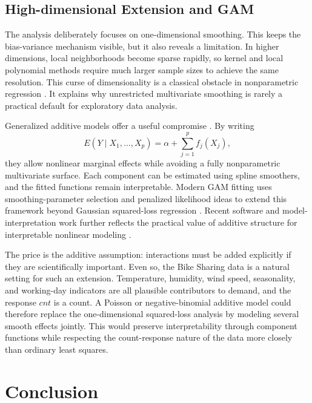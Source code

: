\documentclass[12pt,a4paper]{article}
\begin{document}
\subsection{High-dimensional Extension and GAM}

The analysis deliberately focuses on one-dimensional smoothing. This keeps the bias-variance mechanism visible, but it also reveals a limitation. In higher dimensions, local neighborhoods become sparse rapidly, so kernel and local polynomial methods require much larger sample sizes to achieve the same resolution. This curse of dimensionality is a classical obstacle in nonparametric regression \citep{bellman1961adaptive,stone1982optimal,gyorfi2002distribution}. It explains why unrestricted multivariate smoothing is rarely a practical default for exploratory data analysis.

Generalized additive models offer a useful compromise \citep{hastie1990generalized,wood2017generalized}. By writing
\[
E(Y\mid X_1,\ldots,X_p)=\alpha+\sum_{j=1}^{p}f_j(X_j),
\]
they allow nonlinear marginal effects while avoiding a fully nonparametric multivariate surface. Each component can be estimated using spline smoothers, and the fitted functions remain interpretable. Modern GAM fitting uses smoothing-parameter selection and penalized likelihood ideas to extend this framework beyond Gaussian squared-loss regression \citep{wood2011fast,wood2016smoothing}. Recent software and model-interpretation work further reflects the practical value of additive structure for interpretable nonlinear modeling \citep{simpson2024gratia,arelbundock2024marginaleffects,kraus2024igann,mueller2024gamformer}.

The price is the additive assumption: interactions must be added explicitly if they are scientifically important. Even so, the Bike Sharing data is a natural setting for such an extension. Temperature, humidity, wind speed, seasonality, and working-day indicators are all plausible contributors to demand, and the response \(cnt\) is a count. A Poisson or negative-binomial additive model could therefore replace the one-dimensional squared-loss analysis by modeling several smooth effects jointly. This would preserve interpretability through component functions while respecting the count-response nature of the data more closely than ordinary least squares.

\section{Conclusion}
\label{sec:conclusion}
\end{document}
